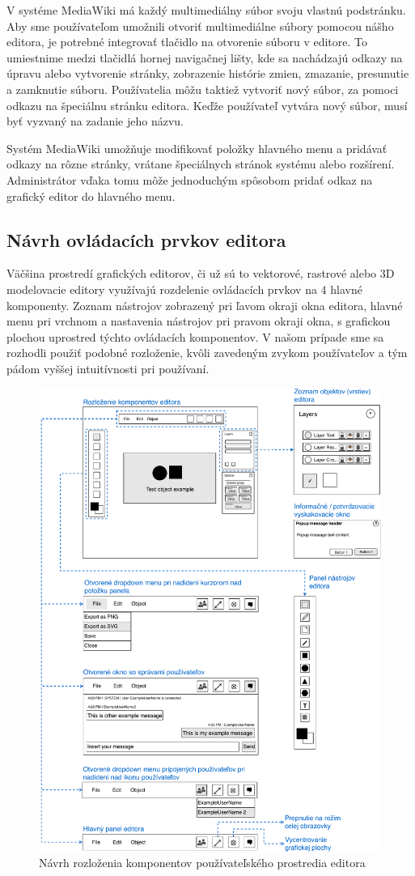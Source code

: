 V systéme MediaWiki má každý multimediálny súbor svoju vlastnú podstránku. Aby sme používateľom umožnili otvoriť multimediálne súbory pomocou nášho editora, je potrebné integrovať tlačidlo na otvorenie súboru v editore. To umiestnime medzi tlačidlá hornej navigačnej lišty, kde sa nachádzajú odkazy na úpravu alebo vytvorenie stránky, zobrazenie histórie zmien, zmazanie, presunutie a zamknutie súboru. Používatelia môžu taktiež vytvoriť nový súbor, za pomoci odkazu na špeciálnu stránku editora. Keďže používateľ vytvára nový súbor, musí byť vyzvaný na zadanie jeho názvu. 

Systém MediaWiki umožňuje modifikovať položky hlavného menu a pridávať odkazy na rôzne stránky, vrátane špeciálnych stránok systému alebo rozšírení. Administrátor vďaka tomu môže jednoduchým spôsobom pridať odkaz na grafický editor do hlavného menu.

\subsection{Návrh ovládacích prvkov editora}
Väčšina prostredí grafických editorov, či už sú to vektorové, rastrové alebo 3D modelovacie editory využívajú rozdelenie ovládacích prvkov na 4 hlavné komponenty. Zoznam nástrojov zobrazený pri ľavom okraji okna editora, hlavné menu pri vrchnom a nastavenia nástrojov pri pravom okraji okna, s grafickou plochou uprostred týchto ovládacích komponentov. V našom prípade sme sa rozhodli použiť podobné rozloženie, kvôli zavedeným zvykom používateľov a tým pádom vyššej intuitívnosti pri používaní.

\begin{figure}[h]
	\centerline{\includegraphics[width=1\textwidth]{images/diagrams/editor_wireframe_base}}
	\caption[Rozloženie komponentov editora]{Návrh rozloženia komponentov používateľského prostredia editora}
	\label{obr:editorWireframeBase}
\end{figure}
\FloatBarrier

